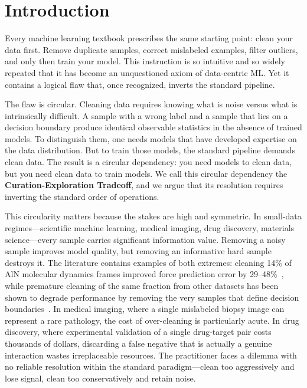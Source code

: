 \documentclass{article}
\begin{document}
\section{Introduction}
\label{sec:introduction}

Every machine learning textbook prescribes the same starting point: clean your data first. Remove duplicate samples, correct mislabeled examples, filter outliers, and only then train your model. This instruction is so intuitive and so widely repeated that it has become an unquestioned axiom of data-centric ML. Yet it contains a logical flaw that, once recognized, inverts the standard pipeline.

The flaw is circular. Cleaning data requires knowing what is noise versus what is intrinsically difficult. A sample with a wrong label and a sample that lies on a decision boundary produce identical observable statistics in the absence of trained models. To distinguish them, one needs models that have developed expertise on the data distribution. But to train those models, the standard pipeline demands clean data. The result is a circular dependency: you need models to clean data, but you need clean data to train models. We call this circular dependency the \textbf{Curation-Exploration Tradeoff}, and we argue that its resolution requires inverting the standard order of operations.

This circularity matters because the stakes are high and symmetric. In small-data regimes---scientific machine learning, medical imaging, drug discovery, materials science---every sample carries significant information value. Removing a noisy sample improves model quality, but removing an informative hard sample destroys it. The literature contains examples of both extremes: cleaning 14\% of AlN molecular dynamics frames improved force prediction error by 29--48\%~\cite{scx2025nature}, while premature cleaning of the same fraction from other datasets has been shown to degrade performance by removing the very samples that define decision boundaries~\cite{northcutt2021confident}. In medical imaging, where a single mislabeled biopsy image can represent a rare pathology, the cost of over-cleaning is particularly acute. In drug discovery, where experimental validation of a single drug-target pair costs thousands of dollars, discarding a false negative that is actually a genuine interaction wastes irreplaceable resources. The practitioner faces a dilemma with no reliable resolution within the standard paradigm---clean too aggressively and lose signal, clean too conservatively and retain noise.
\end{document}

